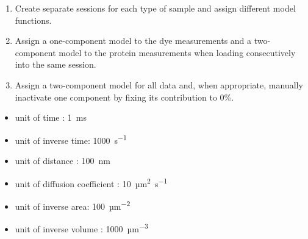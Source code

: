 \begin{enumerate}
\item Create separate sessions for each type of sample and assign different model functions.
\item Assign a one-component model to the dye measurements and a two-component model to the protein measurements when loading consecutively into the same session.
\item Assign a two-component model for all data and, when appropriate, manually inactivate one component by fixing its contribution to 0\%.
\end{enumerate}





	\begin{itemize}
	\item unit of time        : \SI{1}{ms}
	\item  unit of inverse time: \SI{1000}{s^{-1}}
	\item  unit of distance    : \SI{100}{nm}
	\item  unit of diffusion coefficient  : \SI{10}{µm^2s^{-1}}
	\item  unit of inverse area: \SI{100}{µm^{-2}}
	\item  unit of inverse volume : \SI{1000}{µm^{-3}}
	\end{itemize}





